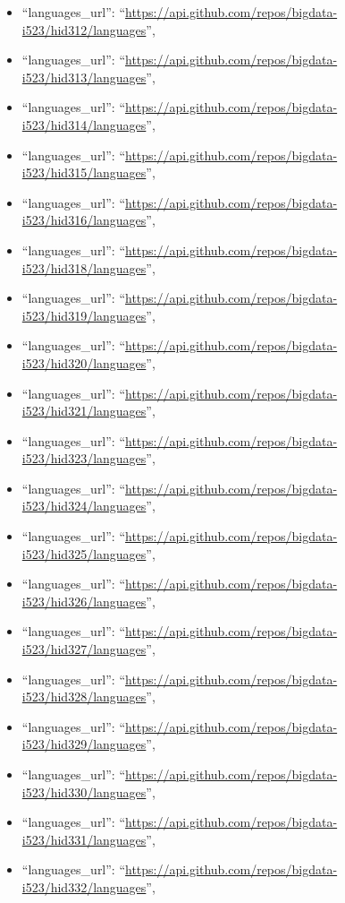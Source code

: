 \begin{itemize}
\item
  ``languages\_url'':
  ``\url{https://api.github.com/repos/bigdata-i523/hid312/languages}'',
\item
  ``languages\_url'':
  ``\url{https://api.github.com/repos/bigdata-i523/hid313/languages}'',
\item
  ``languages\_url'':
  ``\url{https://api.github.com/repos/bigdata-i523/hid314/languages}'',
\item
  ``languages\_url'':
  ``\url{https://api.github.com/repos/bigdata-i523/hid315/languages}'',
\item
  ``languages\_url'':
  ``\url{https://api.github.com/repos/bigdata-i523/hid316/languages}'',
\item
  ``languages\_url'':
  ``\url{https://api.github.com/repos/bigdata-i523/hid318/languages}'',
\item
  ``languages\_url'':
  ``\url{https://api.github.com/repos/bigdata-i523/hid319/languages}'',
\item
  ``languages\_url'':
  ``\url{https://api.github.com/repos/bigdata-i523/hid320/languages}'',
\item
  ``languages\_url'':
  ``\url{https://api.github.com/repos/bigdata-i523/hid321/languages}'',
\item
  ``languages\_url'':
  ``\url{https://api.github.com/repos/bigdata-i523/hid323/languages}'',
\item
  ``languages\_url'':
  ``\url{https://api.github.com/repos/bigdata-i523/hid324/languages}'',
\item
  ``languages\_url'':
  ``\url{https://api.github.com/repos/bigdata-i523/hid325/languages}'',
\item
  ``languages\_url'':
  ``\url{https://api.github.com/repos/bigdata-i523/hid326/languages}'',
\item
  ``languages\_url'':
  ``\url{https://api.github.com/repos/bigdata-i523/hid327/languages}'',
\item
  ``languages\_url'':
  ``\url{https://api.github.com/repos/bigdata-i523/hid328/languages}'',
\item
  ``languages\_url'':
  ``\url{https://api.github.com/repos/bigdata-i523/hid329/languages}'',
\item
  ``languages\_url'':
  ``\url{https://api.github.com/repos/bigdata-i523/hid330/languages}'',
\item
  ``languages\_url'':
  ``\url{https://api.github.com/repos/bigdata-i523/hid331/languages}'',
\item
  ``languages\_url'':
  ``\url{https://api.github.com/repos/bigdata-i523/hid332/languages}'',

\end{itemize}
